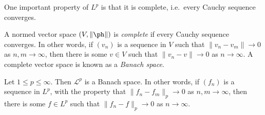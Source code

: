 \documentclass[a4paper]{article}
\begin{document}
One important property of $L^p$ is that it is complete, i.e.\ every Cauchy sequence converges.
\begin{defi}
  A normed vector space $(V, \|\ph\|)$ is \emph{complete} if every Cauchy sequence converges. In other words, if $(v_n)$ is a sequence in $V$ such that $\|v_n - v_m\| \to 0$ as $n, m \to \infty$, then there is some $v \in V$ such that $\|v_n - v\| \to 0$ as $n \to \infty$. A complete vector space is known as a \emph{Banach space}.
\end{defi}

\begin{thm}
  Let $1 \leq p \leq \infty$. Then $\mathcal{L}^p$ is a Banach space. In other words, if $(f_n)$ is a sequence in $L^p$, with the property that $\|f_n - f_m\|_p \to 0$ as $n, m \to \infty$, then there is some $f \in L^p$ such that $\|f_n - f\|_p \to 0$ as $n \to \infty$.
\end{thm}
\end{document}
